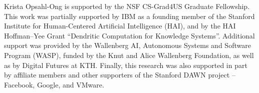 
Krista Opsahl-Ong is supported by the NSF CS-Grad4US Graduate Fellowship.  This work was partially supported by IBM as a founding member of the Stanford Institute for Human-Centered Artificial Intelligence (HAI), and by the HAI Hoffman–Yee Grant “Dendritic Computation for Knowledge Systems”. Additional support was provided by the Wallenberg AI, Autonomous Systems and Software Program (WASP), funded by the Knut and Alice Wallenberg Foundation, as well as by Digital Futures at KTH. Finally, this research was also supported in part by affiliate members and other supporters of the Stanford DAWN project -- Facebook, Google, and VMware.
